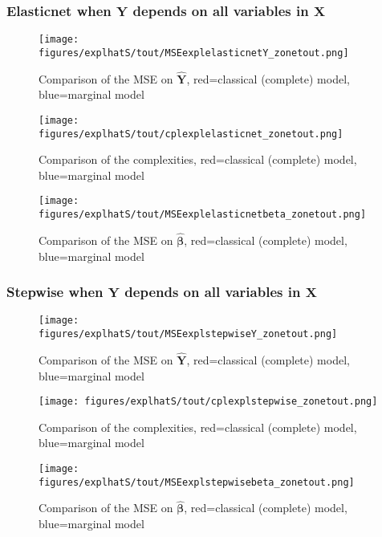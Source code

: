 \documentclass[12pt,a4paper]{report}
\begin{document}
\subsubsection{Elasticnet when $\boldsymbol{Y}$ depends on all variables in $\boldsymbol{X}$}

	\begin{figure}[h!]
	\centering
		  \texttt{[image: figures/explhatS/tout/MSEexplelasticnetY\_zonetout.png]}
		\caption{Comparison of the MSE on $\hat{\boldsymbol{Y}}$, red=classical (complete) model, blue=marginal model}\label{MSEexplelasticnetY_zonetout}
	\end{figure}
	\begin{figure}[h!]
	\centering
		  \texttt{[image: figures/explhatS/tout/cplexplelasticnet\_zonetout.png]}
		\caption{Comparison of the complexities, red=classical (complete) model, blue=marginal model}\label{cplexplelasticnet_zonetout}
	\end{figure}
	\begin{figure}[h!]
	\centering
		  \texttt{[image: figures/explhatS/tout/MSEexplelasticnetbeta\_zonetout.png]}
		\caption{Comparison of the MSE on $\hat{\boldsymbol{\beta}}$, red=classical (complete) model, blue=marginal model}\label{MSEexplelasticnetbeta_zonetout}
	\end{figure}
	\FloatBarrier
\newpage
\subsubsection{Stepwise when $\boldsymbol{Y}$ depends on all variables in $\boldsymbol{X}$}

	\begin{figure}[h!]
	\centering
		  \texttt{[image: figures/explhatS/tout/MSEexplstepwiseY\_zonetout.png]}
		\caption{Comparison of the MSE on $\hat{\boldsymbol{Y}}$, red=classical (complete) model, blue=marginal model}\label{MSEexplstepwiseY_zonetout}
	\end{figure}
	\begin{figure}[h!]
	\centering
		  \texttt{[image: figures/explhatS/tout/cplexplstepwise\_zonetout.png]}
		\caption{Comparison of the complexities, red=classical (complete) model, blue=marginal model}\label{cplexplstepwise_zonetout}
	\end{figure}
	\begin{figure}[h!]
	\centering
		  \texttt{[image: figures/explhatS/tout/MSEexplstepwisebeta\_zonetout.png]}
		\caption{Comparison of the MSE on $\hat{\boldsymbol{\beta}}$, red=classical (complete) model, blue=marginal model}\label{MSEexplstepwisebeta_zonetout}
	\end{figure}
	\FloatBarrier
\newpage
\end{document}
